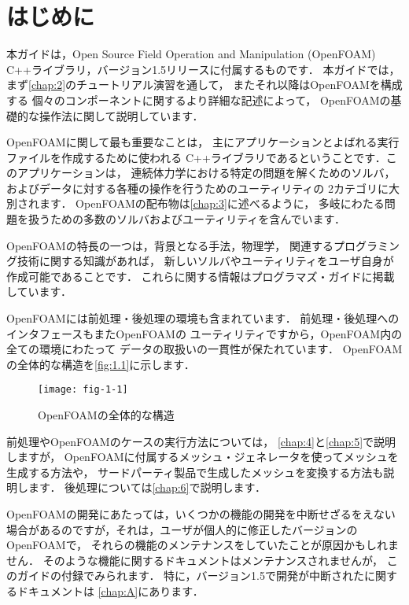 \chapter{はじめに}
\label{chap:1}
本ガイドは，Open Source Field Operation and Manipulation
(OpenFOAM) C++ライブラリ，バージョン1.5リリースに付属するものです．
本ガイドでは，まず\autoref{chap:2}のチュートリアル演習を通して，
またそれ以降はOpenFOAMを構成する
個々のコンポーネントに関するより詳細な記述によって，
OpenFOAMの基礎的な操作法に関して説明しています．

OpenFOAMに関して最も重要なことは，
主にアプリケーションとよばれる実行ファイルを作成するために使われる
C++ライブラリであるということです．このアプリケーションは，
連続体力学における特定の問題を解くためのソルバ，
およびデータに対する各種の操作を行うためのユーティリティの
2カテゴリに大別されます．
OpenFOAMの配布物は\autoref{chap:3}に述べるように，
多岐にわたる問題を扱うための多数のソルバおよびユーティリティを含んでいます．

OpenFOAMの特長の一つは，背景となる手法，物理学，
関連するプログラミング技術に関する知識があれば，
新しいソルバやユーティリティをユーザ自身が作成可能であることです．
これらに関する情報はプログラマズ・ガイドに掲載しています．

OpenFOAMには前処理・後処理の環境も含まれています．
前処理・後処理へのインタフェースもまたOpenFOAMの
ユーティリティですから，OpenFOAM内の全ての環境にわたって
データの取扱いの一貫性が保たれています．
OpenFOAMの全体的な構造を\autoref{fig:1.1}に示します．


\begin{figure}[ht]
 \texttt{[image: fig-1-1]}
 \caption{OpenFOAMの全体的な構造}
 \label{fig:1.1}
\end{figure}


前処理やOpenFOAMのケースの実行方法については，
\autoref{chap:4}と\autoref{chap:5}で説明しますが，
OpenFOAMに付属するメッシュ・ジェネレータを使ってメッシュを生成する方法や，
サードパーティ製品で生成したメッシュを変換する方法も説明します．
後処理については\autoref{chap:6}で説明します．

OpenFOAMの開発にあたっては，いくつかの機能の開発を中断せざるをえない
場合があるのですが，それは，ユーザが個人的に修正したバージョンのOpenFOAMで，
それらの機能のメンテナンスをしていたことが原因かもしれません．
そのような機能に関するドキュメントはメンテナンスされませんが，
このガイドの付録でみられます．
特に，バージョン1.5で開発が中断されたに関するドキュメントは
\autoref{chap:A}にあります．
